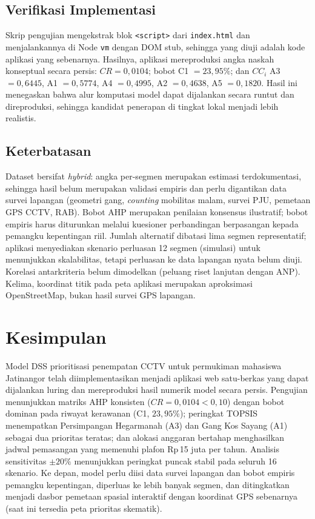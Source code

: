 \documentclass[10pt,twocolumn,a4paper]{article}
\begin{document}
\subsection{Verifikasi Implementasi}
Skrip pengujian mengekstrak blok \texttt{<script>} dari \texttt{index.html} dan menjalankannya di Node \texttt{vm} dengan DOM stub, sehingga yang diuji adalah kode aplikasi yang sebenarnya. Hasilnya, aplikasi mereproduksi angka naskah konseptual secara persis: $CR=0{,}0104$; bobot C1 $=23{,}95\%$; dan $CC_i$ A3 $=0{,}6445$, A1 $=0{,}5774$, A4 $=0{,}4995$, A2 $=0{,}4638$, A5 $=0{,}1820$. Hasil ini menegaskan bahwa alur komputasi model dapat dijalankan secara runtut dan direproduksi, sehingga kandidat penerapan di tingkat lokal menjadi lebih realistis.

\subsection{Keterbatasan}
Dataset bersifat \textit{hybrid}: angka per-segmen merupakan estimasi terdokumentasi, sehingga hasil belum merupakan validasi empiris dan perlu digantikan data survei lapangan (geometri gang, \textit{counting} mobilitas malam, survei PJU, pemetaan GPS CCTV, RAB). Bobot AHP merupakan penilaian konsensus ilustratif; bobot empiris harus diturunkan melalui kuesioner perbandingan berpasangan kepada pemangku kepentingan riil. Jumlah alternatif dibatasi lima segmen representatif; aplikasi menyediakan skenario perluasan 12 segmen (simulasi) untuk menunjukkan skalabilitas, tetapi perluasan ke data lapangan nyata belum diuji. Korelasi antarkriteria belum dimodelkan (peluang riset lanjutan dengan ANP). Kelima, koordinat titik pada peta aplikasi merupakan aproksimasi OpenStreetMap, bukan hasil survei GPS lapangan.

\section{Kesimpulan}

Model DSS prioritisasi penempatan CCTV untuk permukiman mahasiswa Jatinangor telah diimplementasikan menjadi aplikasi web satu-berkas yang dapat dijalankan luring dan mereproduksi hasil numerik model secara persis. Pengujian menunjukkan matriks AHP konsisten ($CR=0{,}0104<0{,}10$) dengan bobot dominan pada riwayat kerawanan (C1, $23{,}95\%$); peringkat TOPSIS menempatkan Persimpangan Hegarmanah (A3) dan Gang Kos Sayang (A1) sebagai dua prioritas teratas; dan alokasi anggaran bertahap menghasilkan jadwal pemasangan yang memenuhi plafon Rp\,15 juta per tahun. Analisis sensitivitas $\pm20\%$ menunjukkan peringkat puncak stabil pada seluruh 16 skenario. Ke depan, model perlu diisi data survei lapangan dan bobot empiris pemangku kepentingan, diperluas ke lebih banyak segmen, dan ditingkatkan menjadi dasbor pemetaan spasial interaktif dengan koordinat GPS sebenarnya (saat ini tersedia peta prioritas skematik).
\end{document}
